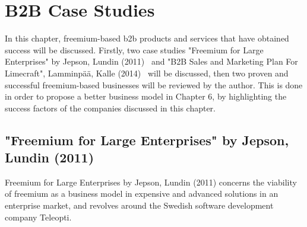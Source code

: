 \chapter{B2B Case Studies}
In this chapter, freemium-based \gls{b2b} products and services that have obtained success will be discussed. Firstly, two case studies "Freemium for Large Enterprises" by Jepson, Lundin (2011)~\cite{jepson2009freemium} and "B2B Sales and Marketing Plan For Limecraft", Lamminpää, Kalle (2014)~\cite{lamminpaa2014b2b} will be discussed, then two proven and successful freemium-based businesses will be reviewed by the author. This is done in order to propose a better business model in Chapter 6, by highlighting the success factors of the companies discussed in this chapter.

\section{"Freemium for Large Enterprises" by Jepson, Lundin (2011)}
Freemium for Large Enterprises by Jepson, Lundin (2011) concerns the viability of freemium as a business model in expensive and advanced solutions in an enterprise market, and revolves around the Swedish software development company Teleopti.

